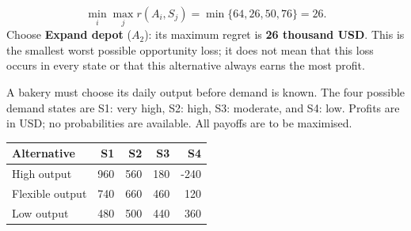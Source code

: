 \[\min_i\max_j r(A_i,S_j)=\min\{64,26,50,76\}=26.\]
Choose \textbf{Expand depot} ($A_2$): its maximum regret is \textbf{26 thousand USD}. This is the smallest worst possible opportunity loss; it does not mean that this loss occurs in every state or that this alternative always earns the most profit.

\clearpage
{}
A bakery must choose its daily output before demand is known. The four possible demand states are S1: very high, S2: high, S3: moderate, and S4: low. Profits are in USD; no probabilities are available. All payoffs are to be maximised.
\begin{center}\small\setlength{\tabcolsep}{4pt}
\begin{tabular}{@{}lrrrr@{}}\toprule
Alternative&S1&S2&S3&S4\\\midrule
High output&960&560&180&-240\\
Flexible output&740&660&460&120\\
Low output&480&500&440&360\\\bottomrule
\end{tabular}\end{center}
